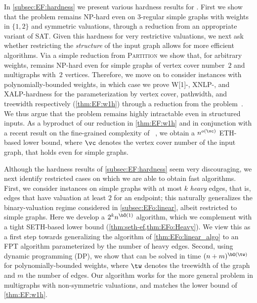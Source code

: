\documentclass[11pt,letterpaper]{article}
\begin{document}
In \cref{subsec:EF:hardness} we present various hardness results for {\EFo}.
First we show that the problem remains NP-hard even on $3$-regular simple graphs with weights in $\{1,2\}$ and symmetric valuations, through a reduction from an appropriate variant of SAT.
Given this hardness for very restrictive valuations,
we next ask whether restricting the \emph{structure} of the input graph allows for more efficient algorithms.
Via a simple reduction from \textsc{Partition} we show that, for arbitrary weights, %
{\EFo} remains NP-hard even for simple graphs of vertex cover number~$2$ and multigraphs with~$2$ vertices.
Therefore, we move on to consider instances with polynomially-bounded weights, in which case
we prove W[1]-, XNLP-, and XALP-hardness for the parameterization by vertex cover, pathwidth, and treewidth respectively (\cref{thm:EF:w1h}) through a reduction from the {\TOO} problem~\cite{wg/BodlaenderCW22,dam/BodlaenderS26}. We thus argue that the problem remains highly intractable even in structured inputs.
As a byproduct of our reduction in \cref{thm:EF:w1h} and in conjunction with a recent result on the fine-grained complexity of \UBP~\cite{bringmann2026tightsethbasedlowerbounds}, we obtain a $n^{o(\vc)}$ ETH-based lower bound,
where $\vc$ denotes the vertex cover number of the input graph, that holds even for simple graphs.

Although the hardness results of \cref{subsec:EF:hardness} seem very discouraging,
we next identify restricted cases on which we are able to obtain fast algorithms.
First, we consider instances on simple graphs with at most $k$ \emph{heavy} edges, that is, edges that have valuation at least $2$ for an endpoint;
this naturally generalizes the binary-valuation regime considered in \cref{subsec:EFo:linear}, albeit restricted to simple graphs.
Here we develop a $2^k n^{\bO(1)}$ algorithm, which we complement with a tight SETH-based lower bound (\cref{thm:seth-ef,thm:EFo:Heavy}).
We view this as a first step towards generalizing the algorithm of \cref{thm:EFo:linear_algo} to an FPT algorithm parameterized by the
number of heavy edges. %
Second, using dynamic programming (DP), we show that {\EFo} can be solved in time $(n+m)^{\bO(\tw)}$ for polynomially-bounded weights,
where $\tw$ denotes the treewidth of the graph and $m$ the number of edges.
Our algorithm works for the more general {\EFmc} problem in multigraphs with non-symmetric valuations,
and matches the lower bound of \cref{thm:EF:w1h}.
\end{document}
